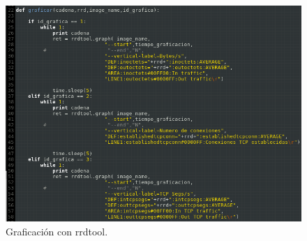 \FloatBarrier
\begin{figure}[htbp!]
		\centering
			\includegraphics[width=.9 \textwidth]{images/graficar8}
		\caption{Graficación con rrdtool.}
		\label{image:graficar8}
\end{figure}
\FloatBarrier